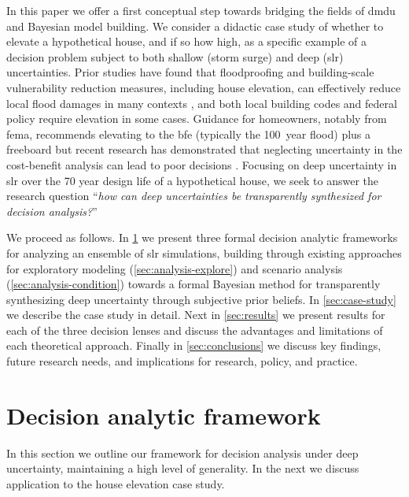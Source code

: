 \documentclass[11pt]{article}
\newcommand{\james}[1]{\todo[color=giallo, textcolor=nero]{\textbf{ATTN James:~}#1}} %
\begin{document}
In this paper we offer a first conceptual step towards bridging the fields of \gls{dmdu} and Bayesian model building.
We consider a didactic case study of whether to elevate a hypothetical house, and if so how high, as a specific example of a decision problem subject to both shallow (storm surge) and deep (\gls{slr}) uncertainties.
Prior studies have found that floodproofing and building-scale vulnerability reduction measures, including house elevation, can effectively reduce local flood damages in many contexts \citep{demoel_reducing:2014,deruig_building:2020,kreibich_building:2005,slotter_floodproofing:2020,rozer_coping:2016,mobley_mitigation:2020,aerts_cost:2018}, and both local building codes \citep{asce_7-10:2013,bruneau_multihazard:2017,asce_24-05:2006} and federal policy \citep{FEMA_p-55:2011} require elevation in some cases.
Guidance for homeowners, notably from \gls{fema}, recommends elevating to the \gls{bfe} (typically the \SI{100}{year} flood) plus a freeboard \citep{fema_retrofitting:2014,asce_24-14:2015,fema_retrofitting:2014} but recent research has demonstrated that neglecting uncertainty in the cost-benefit analysis can lead to poor decisions \citep{zarekarizi_suboptimal:2020}.
Focusing on deep uncertainty in \gls{slr} over the 70\james{Need to re-run codes with 70 rather than 71} year design life of a hypothetical house, we seek to answer the research question ``\emph{how can deep uncertainties be transparently synthesized for decision analysis?}''

We proceed as follows.
In \cref{sec:analysis} we present three formal decision analytic frameworks for analyzing an ensemble of \gls{slr} simulations, building through existing approaches for exploratory modeling (\cref{sec:analysis-explore}) and scenario analysis (\cref{sec:analysis-condition}) towards a formal Bayesian method for transparently synthesizing deep uncertainty through subjective prior beliefs.
In \cref{sec:case-study} we describe the case study in detail.
Next in \cref{sec:results} we present results for each of the three decision lenses and discuss the advantages and limitations of each theoretical approach.
Finally in \cref{sec:conclusions} we discuss key findings, future research needs, and implications for research, policy, and practice.

\section{Decision analytic framework}\label{sec:analysis}

In this section we outline our framework for decision analysis under deep uncertainty, maintaining a high level of generality.
In the next we discuss application to the house elevation case study.
\end{document}

